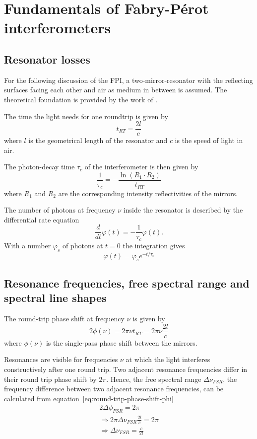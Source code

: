 \section{Fundamentals of Fabry-Pérot interferometers}


\subsection{Resonator losses}
For the following discussion of the \ac{FPI}, a two-mirror-resonator with the reflecting surfaces facing each other and air as medium in between is assumed.
The theoretical foundation is provided by the work of \textcite{ismail_fabry-perot_2016}.

The time the light needs for one roundtrip is given by
\begin{equation}
t_{RT} = \frac{2l}{c}
\end{equation}
where $l$ is the geometrical length of the resonator and $c$ is the speed of light in air.

The photon-decay time $\tau_c$ of the interferometer is then given by
\begin{equation}
\frac{1}{\tau_c} = - \frac{\ln(R_1 \cdot R_2)}{t_{RT}}
\end{equation}
where $R_1$ and $R_2$ are the corresponding intensity reflectivities of the mirrors.

The number of photons at frequency $\nu$ inside the resonator is described by the differential rate equation
\begin{equation}
\frac{d}{dt} \varphi(t) = - \frac{1}{\tau_c}\varphi(t).
\end{equation}
With a number $\varphi_s$ of photons at $t=0$ the integration gives
\begin{equation}
\label{eq:photon-decay}
\varphi(t)=\varphi_s e^{-t/\tau_c}
\end{equation}

\subsection{Resonance frequencies, free spectral range and spectral line shapes}
The round-trip phase shift at frequency $\nu$ is given by
\begin{equation}
\label{eq:round-trip-phase-shift-phi}
2 \phi(\nu) = 2 \pi \nu t_{RT} = 2 \pi \nu \frac{2l}{c}
\end{equation}
where $\phi(\nu)$ is the single-pass phase shift between the mirrors.

Resonances are visible for frequencies $\nu$ at which the light interferes constructively after one round trip.
Two adjacent resonance frequencies differ in their round trip phase shift by $2 \pi$.
Hence, the free spectral range $\Delta \nu_{FSR}$, the frequency difference between two adjacent resonance frequencies, can be calculated from equation~\eqref{eq:round-trip-phase-shift-phi}
\begin{align}
2\Delta\phi_{FSR} = 2\pi \\
\Rightarrow 2\pi\Delta\nu_{FSR}\frac{2l}{c} = 2\pi\\
\label{eq:free-spectral-range}
\Rightarrow \Delta\nu_{FSR} = \frac{c}{2l}
\end{align}

